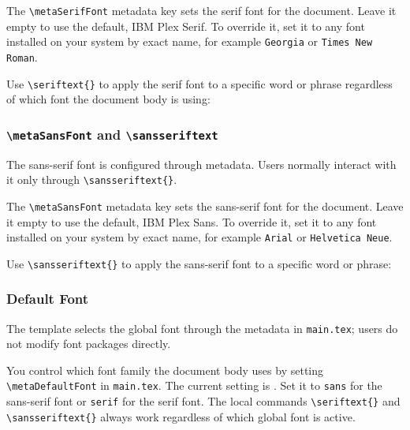 		The \texttt{\textbackslash metaSerifFont} metadata key sets the serif font for the document. Leave it empty to use the default, IBM Plex Serif. To override it, set it to any font installed on your system by exact name, for example \texttt{Georgia} or \texttt{Times New Roman}.
		
		Use \texttt{\textbackslash seriftext\{\}} to apply the serif font to a specific word or phrase regardless of which font the document body is using:
		
		
		\subsubsection{\texttt{\textbackslash metaSansFont} and \texttt{\textbackslash sansseriftext}}
		\noindent\colorbox{themecolour!15}{\parbox{\linewidth}{\small The sans-serif font is configured through metadata. Users normally interact with it only through \texttt{\textbackslash sansseriftext\{\}}.}}\vspace{0.5\baselineskip}
		
		The \texttt{\textbackslash metaSansFont} metadata key sets the sans-serif font for the document. Leave it empty to use the default, IBM Plex Sans. To override it, set it to any font installed on your system by exact name, for example \texttt{Arial} or \texttt{Helvetica Neue}.
		
		Use \texttt{\textbackslash sansseriftext\{\}} to apply the sans-serif font to a specific word or phrase:
		
		
		\subsubsection{Default Font}
		\noindent\colorbox{themecolour!15}{\parbox{\linewidth}{\small The template selects the global font through the metadata in \texttt{main.tex}; users do not modify font packages directly.}}\vspace{0.5\baselineskip}
		
		You control which font family the document body uses by setting \texttt{\textbackslash metaDefaultFont} in \texttt{main.tex}. The current setting is \texttt{\metaDefaultFont}. Set it to \texttt{sans} for the sans-serif font or \texttt{serif} for the serif font. The local commands \texttt{\textbackslash seriftext\{\}} and \texttt{\textbackslash sansseriftext\{\}} always work regardless of which global font is active.
		

